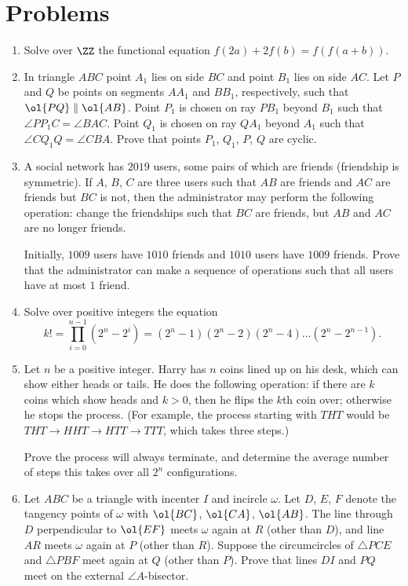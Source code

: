 \documentclass[11pt]{scrartcl}
\begin{document}
\section{Problems}
\begin{enumerate}[\bfseries 1.]
\item %
Solve over $\ZZ$ the functional equation
$f(2a) + 2f(b) = f(f(a+b))$.

\item %
In triangle $ABC$ point $A_1$ lies on side $BC$
and point $B_1$ lies on side $AC$.
Let $P$ and $Q$ be points on segments $AA_1$ and $BB_1$,
respectively, such that $\ol{PQ} \parallel \ol{AB}$.
Point $P_1$ is chosen on ray $PB_1$ beyond $B_1$
such that $\angle PP_1C = \angle BAC$.
Point $Q_1$ is chosen on ray $QA_1$ beyond $A_1$
such that $\angle CQ_1Q = \angle CBA$.
Prove that points $P_1$, $Q_1$, $P$, $Q$ are cyclic.

\item %
A social network has $2019$ users, some pairs of which are friends (friendship is symmetric).
If $A$, $B$, $C$ are three users such that $AB$ are friends and $AC$ are friends but $BC$ is not,
then the administrator may perform the following operation:
change the friendships such that $BC$ are friends, but $AB$ and $AC$ are no longer friends.

Initially, $1009$ users have $1010$ friends and $1010$ users have $1009$ friends.
Prove that the administrator can make a sequence of operations
such that all users have at most $1$ friend.

\item %
Solve over positive integers the equation
\[ k! = \prod_{i=0}^{n-1} (2^n-2^i)
  = (2^n-1)(2^n-2)(2^n-4) \dots (2^n-2^{n-1}). \]

\item %
Let $n$ be a positive integer.
Harry has $n$ coins lined up on his desk, which can show either heads or tails.
He does the following operation: if there are $k$ coins which show heads and $k > 0$,
then he flips the $k$th coin over; otherwise he stops the process.
(For example, the process starting with $THT$ would be
$THT \to HHT \to HTT \to TTT$, which takes three steps.)

Prove the process will always terminate, and determine the average number of steps
this takes over all $2^n$ configurations.

\item %
Let $ABC$ be a triangle with incenter $I$ and incircle $\omega$.
Let $D$, $E$, $F$ denote the tangency points of $\omega$ with $\ol{BC}$, $\ol{CA}$, $\ol{AB}$.
The line through $D$ perpendicular to $\ol{EF}$ meets $\omega$ again at $R$ (other than $D$),
and line $AR$ meets $\omega$ again at $P$ (other than $R$).
Suppose the circumcircles of $\triangle PCE$ and $\triangle PBF$ meet again at $Q$ (other than $P$).
Prove that lines $DI$ and $PQ$ meet on the external $\angle A$-bisector.

\end{enumerate}
\pagebreak
\end{document}
